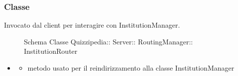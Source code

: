 \subsubsection{Classe }
Invocato dal client per interagire con InstitutionManager.
\begin{figure}[H]
\centering
\noindent{}
\caption[Schema Classe InstitutionRouter]{Schema Classe Quizzipedia:: Server:: RoutingManager:: InstitutionRouter}
\end{figure}
\begin{itemize}
\item {}
\begin{itemize}
\item {}
\newline
metodo usato per il reindirizzamento alla classe InstitutionManager
\newline
\end{itemize}
\end{itemize}
